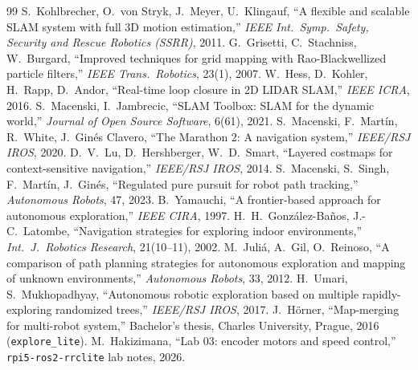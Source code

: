 \documentclass[10pt,twocolumn]{article}
\begin{document}
\begin{thebibliography}{99}\small
{} S.~Kohlbrecher, O.~von Stryk, J.~Meyer, U.~Klingauf, ``A flexible and scalable SLAM system with full 3D motion estimation,'' \emph{IEEE Int.\ Symp.\ Safety, Security and Rescue Robotics (SSRR)}, 2011.
 G.~Grisetti, C.~Stachniss, W.~Burgard, ``Improved techniques for grid mapping with Rao-Blackwellized particle filters,'' \emph{IEEE Trans.\ Robotics}, 23(1), 2007.
 W.~Hess, D.~Kohler, H.~Rapp, D.~Andor, ``Real-time loop closure in 2D LIDAR SLAM,'' \emph{IEEE ICRA}, 2016.
 S.~Macenski, I.~Jambrecic, ``SLAM Toolbox: SLAM for the dynamic world,'' \emph{Journal of Open Source Software}, 6(61), 2021.
 S.~Macenski, F.~Mart\'in, R.~White, J.~Gin\'es Clavero, ``The Marathon 2: A navigation system,'' \emph{IEEE/RSJ IROS}, 2020.
 D.~V.~Lu, D.~Hershberger, W.~D.~Smart, ``Layered costmaps for context-sensitive navigation,'' \emph{IEEE/RSJ IROS}, 2014.
 S.~Macenski, S.~Singh, F.~Mart\'in, J.~Gin\'es, ``Regulated pure pursuit for robot path tracking,'' \emph{Autonomous Robots}, 47, 2023.
 B.~Yamauchi, ``A frontier-based approach for autonomous exploration,'' \emph{IEEE CIRA}, 1997.
 H.~H.~Gonz\'alez-Ba\~nos, J.-C.~Latombe, ``Navigation strategies for exploring indoor environments,'' \emph{Int.\ J.\ Robotics Research}, 21(10--11), 2002.
 M.~Juli\'a, A.~Gil, O.~Reinoso, ``A comparison of path planning strategies for autonomous exploration and mapping of unknown environments,'' \emph{Autonomous Robots}, 33, 2012.
 H.~Umari, S.~Mukhopadhyay, ``Autonomous robotic exploration based on multiple rapidly-exploring randomized trees,'' \emph{IEEE/RSJ IROS}, 2017.
 J.~H\"orner, ``Map-merging for multi-robot system,'' Bachelor's thesis, Charles University, Prague, 2016 (\texttt{explore\_lite}).
 M.~Hakizimana, ``Lab 03: encoder motors and speed control,'' \texttt{rpi5-ros2-rrclite} lab notes, 2026.
\end{thebibliography}
\end{document}
